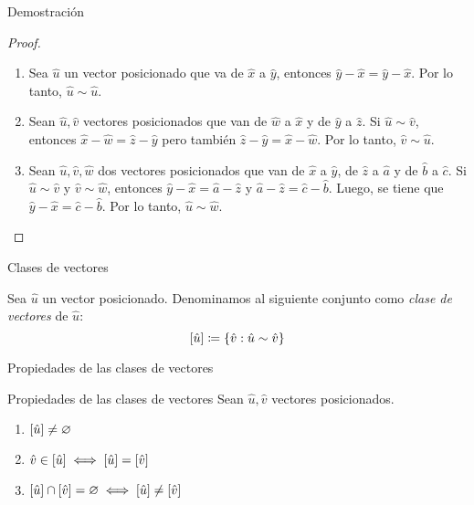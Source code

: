     \begin{frame}{Demostración}
        \begin{proof}
            \begin{enumerate}
                \item Sea $\hat{u}$ un vector posicionado que va de $\hat{x}$ a $\hat{y}$, entonces $\hat{y}-\hat{x}=\hat{y}-\hat{x}$. Por lo tanto, $\hat{u}\sim\hat{u}$.
                \item Sean $\hat{u},\hat{v}$ vectores posicionados que van de $\hat{w}$ a $\hat{x}$ y de $\hat{y}$ a $\hat{z}$. Si $\hat{u}\sim\hat{v}$, entonces $\hat{x}-\hat{w}=\hat{z}-\hat{y}$ pero también $\hat{z}-\hat{y}=\hat{x}-\hat{w}$. Por lo tanto, $\hat{v}\sim\hat{u}$.
                \item Sean $\hat{u},\hat{v},\hat{w}$ dos vectores posicionados que van de $\hat{x}$ a $\hat{y}$, de $\hat{z}$ a $\hat{a}$ y de $\hat{b}$ a $\hat{c}$. Si $\hat{u}\sim\hat{v}$ y $\hat{v}\sim\hat{w}$, entonces $\hat{y}-\hat{x}=\hat{a}-\hat{z}$ y $\hat{a}-\hat{z}=\hat{c}-\hat{b}$. Luego, se tiene que $\hat{y}-\hat{x}=\hat{c}-\hat{b}$. Por lo tanto, $\hat{u}\sim\hat{w}$.
            \end{enumerate}
        \end{proof}
    \end{frame}
    \begin{frame}{Clases de vectores}
        \begin{mdefinition}
            Sea $\hat{u}$ un vector posicionado. Denominamos al siguiente conjunto como \emph{clase de vectores} de $\hat{u}$:
            \[\left[ \hat{u} \right]\coloneqq\left\{ \hat{v}:\hat{u}\sim\hat{v} \right\}\]
        \end{mdefinition}
    \end{frame}
    \begin{frame}{Propiedades de las clases de vectores}
        \begin{mtheorem}{Propiedades de las clases de vectores}
            Sean $\hat{u},\hat{v}$ vectores posicionados.
            \begin{enumerate}
                \item $\left[ \hat{u} \right]\neq\varnothing$
                \item $\hat{v}\in\left[ \hat{u} \right]\iff\left[ \hat{u} \right]=\left[ \hat{v} \right]$
                \item $\left[ \hat{u} \right]\cap\left[ \hat{v} \right]=\varnothing\iff\left[ \hat{u} \right]\neq\left[ \hat{v} \right]$
            \end{enumerate}
        \end{mtheorem}
    \end{frame}
